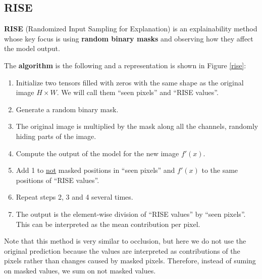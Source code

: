 \subsection{RISE}

\textbf{RISE} (Randomized Input Sampling for Explanation) is an explainability method whose key focus is using \textbf{random binary masks} and observing how they affect the model output.

The \textbf{algorithm} is the following  and a representation is shown in Figure \ref{rise}:
\begin{enumerate}
\item Initialize two tensors filled with zeros with the same shape as the original image $H\times W$. We will call them ``seen pixels'' and ``RISE values''.
\item Generate a random binary mask.
\item The original image is multiplied by the mask along all the channels, randomly hiding parts of the image.
\item Compute the output of the model for the new image $f'(x)$.
\item Add 1 to \underline{not} masked positions in ``seen pixels'' and $f'(x)$ to the same positions of ``RISE values''.
\item Repeat steps 2, 3 and 4 several times.
\item The output is the element-wise division of ``RISE values'' by ``seen pixels''. This can be interpreted as the mean contribution per pixel.
\end{enumerate}
Note that this method is very similar to occlusion, but here we do not use the original prediction because the values are interpreted as contributions of the pixels rather than changes caused by masked pixels. Therefore, instead of suming on masked values, we sum on not masked values.

